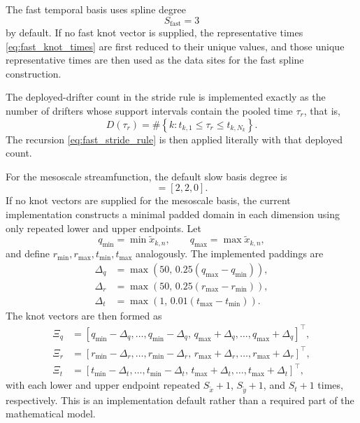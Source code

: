 The fast temporal basis uses spline degree
\begin{equation}
S_{\mathrm{fast}} = 3
\end{equation}
by default. If no fast knot vector is supplied, the representative times
\eqref{eq:fast_knot_times} are first reduced to their unique values, and those unique
representative times are then used as the data sites for the fast spline construction.

The deployed-drifter count in the stride rule is implemented exactly as the number of drifters
whose support intervals contain the pooled time $\tau_r$, that is,
\begin{equation}
D(\tau_r)
=
\#\left\{
k : t_{k,1} \le \tau_r \le t_{k,N_k}
\right\}.
\end{equation}
The recursion \eqref{eq:fast_stride_rule} is then applied literally with that deployed count.

For the mesoscale streamfunction, the default slow basis degree is
\begin{equation}
[S_{\tilde{x}}, S_{\tilde{y}}, S_t] = [2,2,0].
\end{equation}
If no knot vectors are supplied for the mesoscale basis, the current implementation constructs
a minimal padded domain in each dimension using only repeated lower and upper endpoints. Let
\begin{equation}
q_{\min} = \min \tilde{x}_{k,n}, \qquad q_{\max} = \max \tilde{x}_{k,n},
\end{equation}
and define $r_{\min}, r_{\max}, t_{\min}, t_{\max}$ analogously. The implemented paddings are
\begin{align}
\Delta_q &= \max\!\left(50,\, 0.25(q_{\max}-q_{\min})\right),
\\
\Delta_r &= \max\!\left(50,\, 0.25(r_{\max}-r_{\min})\right),
\\
\Delta_t &= \max\!\left(1,\, 0.01(t_{\max}-t_{\min})\right).
\end{align}
The knot vectors are then formed as
\begin{align}
\Xi_q &= \left[q_{\min}-\Delta_q, \dots, q_{\min}-\Delta_q,\,
q_{\max}+\Delta_q, \dots, q_{\max}+\Delta_q\right]^\top,
\\
\Xi_r &= \left[r_{\min}-\Delta_r, \dots, r_{\min}-\Delta_r,\,
r_{\max}+\Delta_r, \dots, r_{\max}+\Delta_r\right]^\top,
\\
\Xi_t &= \left[t_{\min}-\Delta_t, \dots, t_{\min}-\Delta_t,\,
t_{\max}+\Delta_t, \dots, t_{\max}+\Delta_t\right]^\top,
\end{align}
with each lower and upper endpoint repeated $S_{\tilde{x}}+1$, $S_{\tilde{y}}+1$, and
$S_t+1$ times, respectively. This is an implementation default rather than a required part of
the mathematical model.

